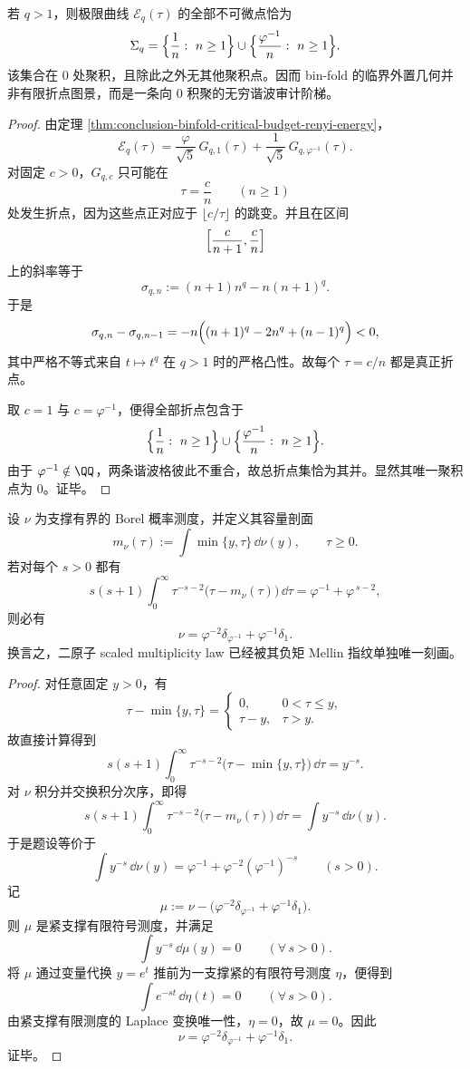 \begin{corollary}[高阶审计曲线的无穷谐波折点结构]\label{cor:conclusion-binfold-harmonic-staircase-kinks}
若 \(q>1\)，则极限曲线 \(\mathcal E_q(\tau)\) 的全部不可微点恰为
\[
\Sigma_q=
\Bigl\{\frac1n:\ n\ge 1\Bigr\}
\cup
\Bigl\{\frac{\varphi^{-1}}{n}:\ n\ge 1\Bigr\}.
\]
该集合在 \(0\) 处聚积，且除此之外无其他聚积点。因而 bin-fold 的临界外置几何并非有限折点图景，而是一条向 \(0\) 积聚的无穷谐波审计阶梯。
\end{corollary}
\begin{proof}
由定理 \ref{thm:conclusion-binfold-critical-budget-renyi-energy}，
\[
\mathcal E_q(\tau)
=
\frac{\varphi}{\sqrt5}\,G_{q,1}(\tau)
+
\frac1{\sqrt5}\,G_{q,\varphi^{-1}}(\tau).
\]
对固定 \(c>0\)，\(G_{q,c}\) 只可能在
\[
\tau=\frac{c}{n}
\qquad (n\ge 1)
\]
处发生折点，因为这些点正对应于 \(\lfloor c/\tau\rfloor\) 的跳变。并且在区间
\[
\Bigl[\frac{c}{n+1},\frac{c}{n}\Bigr]
\]
上的斜率等于
\[
\sigma_{q,n}:=(n+1)n^q-n(n+1)^q.
\]
于是
\[
\sigma_{q,n}-\sigma_{q,n-1}
=
-n\Bigl((n+1)^q-2n^q+(n-1)^q\Bigr)<0,
\]
其中严格不等式来自 \(t\mapsto t^q\) 在 \(q>1\) 时的严格凸性。故每个 \(\tau=c/n\) 都是真正折点。

取 \(c=1\) 与 \(c=\varphi^{-1}\)，便得全部折点包含于
\[
\Bigl\{\frac1n:\ n\ge 1\Bigr\}
\cup
\Bigl\{\frac{\varphi^{-1}}{n}:\ n\ge 1\Bigr\}.
\]
由于 \(\varphi^{-1}\notin\QQ\)，两条谐波格彼此不重合，故总折点集恰为其并。显然其唯一聚积点为 \(0\)。证毕。
\end{proof}

\begin{theorem}\label{thm:conclusion-negative-mellin-two-atom-uniqueness}
设 \(\nu\) 为支撑有界的 Borel 概率测度，并定义其容量剖面
\[
m_\nu(\tau):=\int \min\{y,\tau\}\,\dd\nu(y),
\qquad
\tau\ge 0.
\]
若对每个 \(s>0\) 都有
\[
s(s+1)\int_0^\infty \tau^{-s-2}\bigl(\tau-m_\nu(\tau)\bigr)\,\dd\tau
=
\varphi^{-1}+\varphi^{\,s-2},
\]
则必有
\[
\nu=\varphi^{-2}\delta_{\varphi^{-1}}+\varphi^{-1}\delta_1.
\]
换言之，二原子 scaled multiplicity law 已经被其负矩 Mellin 指纹单独唯一刻画。
\end{theorem}
\begin{proof}
对任意固定 \(y>0\)，有
\[
\tau-\min\{y,\tau\}=
\begin{cases}
0, & 0<\tau\le y,\\[2pt]
\tau-y, & \tau>y.
\end{cases}
\]
故直接计算得到
\[
s(s+1)\int_0^\infty \tau^{-s-2}\bigl(\tau-\min\{y,\tau\}\bigr)\,\dd\tau
=
y^{-s}.
\]
对 \(\nu\) 积分并交换积分次序，即得
\[
s(s+1)\int_0^\infty \tau^{-s-2}\bigl(\tau-m_\nu(\tau)\bigr)\,\dd\tau
=
\int y^{-s}\,\dd\nu(y).
\]
于是题设等价于
\[
\int y^{-s}\,\dd\nu(y)
=
\varphi^{-1}+\varphi^{-2}(\varphi^{-1})^{-s}
\qquad (s>0).
\]
记
\[
\mu:=\nu-\bigl(\varphi^{-2}\delta_{\varphi^{-1}}+\varphi^{-1}\delta_1\bigr).
\]
则 \(\mu\) 是紧支撑有限符号测度，并满足
\[
\int y^{-s}\,\dd\mu(y)=0
\qquad (\forall\,s>0).
\]
将 \(\mu\) 通过变量代换 \(y=e^t\) 推前为一支撑紧的有限符号测度 \(\eta\)，便得到
\[
\int e^{-st}\,\dd\eta(t)=0
\qquad (\forall\,s>0).
\]
由紧支撑有限测度的 Laplace 变换唯一性，\(\eta=0\)，故 \(\mu=0\)。因此
\[
\nu=\varphi^{-2}\delta_{\varphi^{-1}}+\varphi^{-1}\delta_1.
\]
证毕。
\end{proof}

